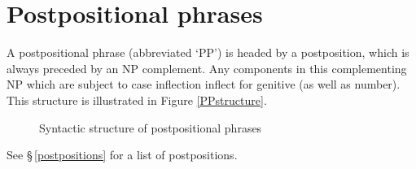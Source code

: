 \section{Postpositional phrases}\label{postpositionalPhrases}
A postpositional phrase (abbreviated ‘PP’) is headed by a postposition, which is always preceded by an NP complement. Any components in this complementing NP which are subject to case inflection inflect for genitive (as well as number). This structure is illustrated in Figure \vref{PPstructure}. 
\begin{figure}[h]
\caption{Syntactic structure of postpositional phrases}\label{PPstructure}
\end{figure}
See §\,\vref{postpositions} for a list of postpositions. 

